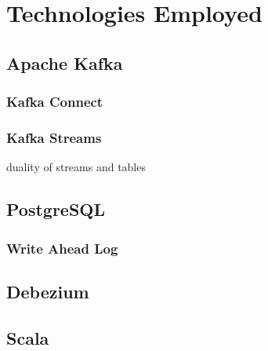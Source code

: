 \chapter{Technologies Employed}
\label{ch:techs}

\section{Apache Kafka}
\label{sec:kafka}

\subsection{Kafka Connect}
\label{sec:kafka-connect}

\subsection{Kafka Streams}
\label{sec:kafka-streams}

duality of streams and tables

\section{PostgreSQL}

\subsection{Write Ahead Log}
\label{sec:wal}

\section{Debezium}
\label{sec:debezium}

\section{Scala}
